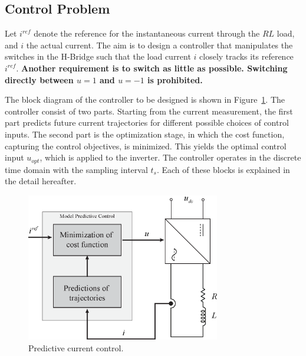 \documentclass[11pt,a4paper,oneside]{book}
\numberwithin{equation}{section}
\theoremstyle{it}
\theoremstyle{definition}
\begin{document}
\subsection{Control Problem} 
Let $i^{ref}$ denote the reference for the instantaneous current through the 
$RL$ load, and $i$ the actual current. The aim is to design a controller that 
manipulates the switches in the H-Bridge such that the load current $i$ closely 
tracks its reference $i^{ref}$. \textbf{Another requirement is to switch as 
little as possible. Switching directly between $u=1$ and $u=-1$ is prohibited.}

The block diagram of the controller to be designed is shown in 
Figure~\ref{fig:cctrl_block}. The controller consist of two parts. Starting 
from the current measurement, the first part predicts future current 
trajectories for different possible choices of control inputs. The second part 
is the optimization stage, in which the cost function, capturing the control 
objectives, is minimized. This yields  the optimal control input $u_{opt}$, 
which is applied to the inverter. The controller operates in the discrete time 
domain with the sampling interval $t_s$. Each of these blocks is explained in 
the detail hereafter.
\begin{figure}[H]
	\centering
	\includegraphics[width = 240pt, 
	keepaspectratio]{figures/mpc/mpd_blocks.eps}
	\captionsetup{width=.5\textwidth}
	\caption{Predictive current control.}
	\label{fig:cctrl_block}
\end{figure}
\end{document}
